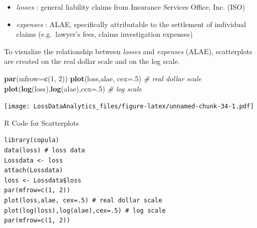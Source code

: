 \documentclass[]{book}
\newenvironment{Shaded}{\begin{snugshade}}{\end{snugshade}}
\newcommand{\KeywordTok}[1]{\textcolor[rgb]{0.13,0.29,0.53}{\textbf{{#1}}}}
\newcommand{\DataTypeTok}[1]{\textcolor[rgb]{0.13,0.29,0.53}{{#1}}}
\newcommand{\DecValTok}[1]{\textcolor[rgb]{0.00,0.00,0.81}{{#1}}}
\newcommand{\StringTok}[1]{\textcolor[rgb]{0.31,0.60,0.02}{{#1}}}
\newcommand{\CommentTok}[1]{\textcolor[rgb]{0.56,0.35,0.01}{\textit{{#1}}}}
\newcommand{\NormalTok}[1]{{#1}}
\providecommand{\tightlist}{%
  \setlength{\itemsep}{0pt}\setlength{\parskip}{0pt}}
\theoremstyle{definition}
\theoremstyle{definition}
\theoremstyle{definition}
\theoremstyle{remark}
\begin{document}
\begin{itemize}
\tightlist
\item
  \emph{losses }: general liability claims from Insurance Services
  Office, Inc. (ISO)
\item
  \emph{expenses }: ALAE, specifically attributable to the settlement of
  individual claims (e.g.~lawyer's fees, claims investigation expenses)
\end{itemize}

\begin{Shaded}
\end{Shaded}

To visualize the relationship between \emph{losses } and \emph{expenses
} (ALAE), scatterplots are created on the real dollar scale and on the
log scale.

\begin{Shaded}
\begin{Highlighting}[]
\KeywordTok{par}\NormalTok{(}\DataTypeTok{mfrow=}\KeywordTok{c}\NormalTok{(}\DecValTok{1}\NormalTok{, }\DecValTok{2}\NormalTok{))}
\KeywordTok{plot}\NormalTok{(loss,alae, }\DataTypeTok{cex=}\NormalTok{.}\DecValTok{5}\NormalTok{) }\CommentTok{# real dollar scale}
\KeywordTok{plot}\NormalTok{(}\KeywordTok{log}\NormalTok{(loss),}\KeywordTok{log}\NormalTok{(alae),}\DataTypeTok{cex=}\NormalTok{.}\DecValTok{5}\NormalTok{) }\CommentTok{# log scale}
\end{Highlighting}
\end{Shaded}

\texttt{[image: LossDataAnalytics\_files/figure-latex/unnamed-chunk-34-1.pdf]}

R Code for Scatterplots

\hypertarget{display.ScaHis.2}{}
\begin{verbatim}
library(copula)
data(loss) # loss data
Lossdata <- loss 
attach(Lossdata) 
loss <- Lossdata$loss
par(mfrow=c(1, 2))
plot(loss,alae, cex=.5) # real dollar scale
plot(log(loss),log(alae),cex=.5) # log scale
par(mfrow=c(1, 2))
\end{verbatim}
\end{document}
